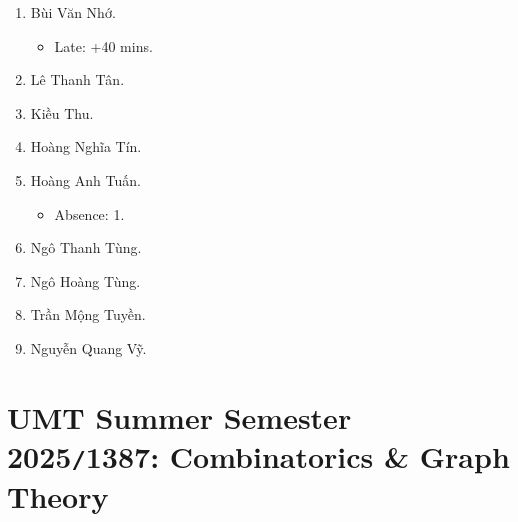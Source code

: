 \documentclass{article}
\begin{document}
\begin{enumerate}
	\item {\sc Bùi Văn Nhớ}.
	\begin{itemize}
		\item Late: +40 mins.
	\end{itemize}
	\item {\sc Lê Thanh Tân.}
	\item {\sc Kiều Thu.}
	\item {\sc Hoàng Nghĩa Tín.}
	\item {\sc Hoàng Anh Tuấn.}
	\begin{itemize}
		\item Absence: 1.
	\end{itemize}
	\item {\sc Ngô Thanh Tùng.}
	\item {\sc Ngô Hoàng Tùng.}
	\item {\sc Trần Mộng Tuyền.}
	\item {\sc Nguyễn Quang Vỹ.}	
\end{enumerate}


\section{UMT Summer Semester 2025{\tt/}1387: Combinatorics \& Graph Theory}
\end{document}
